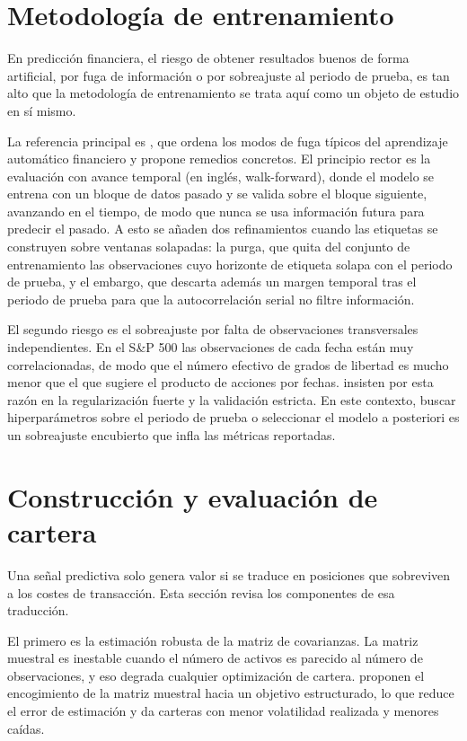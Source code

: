 \section{Metodología de entrenamiento}

En predicción financiera, el riesgo de obtener resultados buenos de forma artificial, por
fuga de información o por sobreajuste al periodo de prueba, es tan alto que la metodología
de entrenamiento se trata aquí como un objeto de estudio en sí mismo.

La referencia principal es \textcite{deprado2018advances}, que ordena los modos de fuga
típicos del aprendizaje automático financiero y propone remedios concretos. El principio
rector es la evaluación con avance temporal (en inglés, walk-forward), donde el modelo se
entrena con un bloque de datos pasado y se valida sobre el bloque siguiente, avanzando en
el tiempo, de modo que nunca se usa información futura para predecir el pasado. A esto se
añaden dos refinamientos cuando las etiquetas se construyen sobre ventanas solapadas: la
purga, que quita del conjunto de entrenamiento las observaciones cuyo horizonte de
etiqueta solapa con el periodo de prueba, y el embargo, que descarta además un margen
temporal tras el periodo de prueba para que la autocorrelación serial no filtre
información.

El segundo riesgo es el sobreajuste por falta de observaciones transversales
independientes. En el S\&P 500 las observaciones de cada fecha están muy correlacionadas,
de modo que el número efectivo de grados de libertad es mucho menor que el que sugiere el
producto de acciones por fechas. \textcite{gu2020empirical} insisten por esta razón en la
regularización fuerte y la validación estricta. En este contexto, buscar hiperparámetros
sobre el periodo de prueba o seleccionar el modelo a posteriori es un sobreajuste
encubierto que infla las métricas reportadas.

\section{Construcción y evaluación de cartera}

Una señal predictiva solo genera valor si se traduce en posiciones que sobreviven a los
costes de transacción. Esta sección revisa los componentes de esa traducción.

El primero es la estimación robusta de la matriz de covarianzas. La matriz muestral es
inestable cuando el número de activos es parecido al número de observaciones, y eso
degrada cualquier optimización de cartera. \textcite{ledoit2004honey} proponen el
encogimiento de la matriz muestral hacia un objetivo estructurado, lo que reduce el error
de estimación y da carteras con menor volatilidad realizada y menores caídas.

